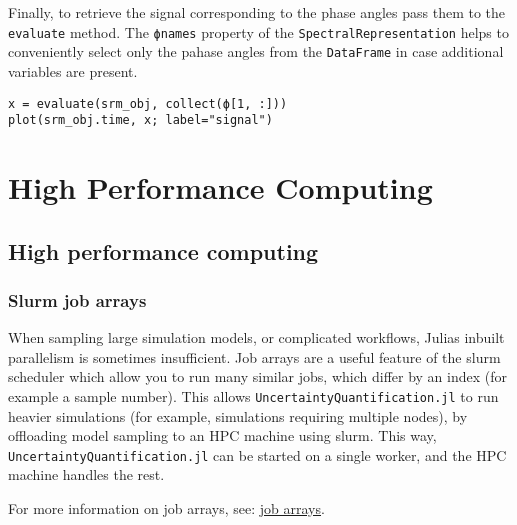 Finally, to retrieve the signal corresponding to the phase angles  pass them to the \texttt{evaluate} method. The \texttt{ϕnames} property of the \texttt{SpectralRepresentation} helps to conveniently select only the pahase angles from the \texttt{DataFrame} in case additional variables are present.




\begin{verbatim}
x = evaluate(srm_obj, collect(ϕ[1, :]))
plot(srm_obj.time, x; label="signal")
\end{verbatim}



\begin{figure}
\centering
\caption{}
\end{figure}




\chapter{High Performance Computing}


\section{High performance computing}



\label{15324308029856110982}{}


\subsection{Slurm job arrays}



\label{3608381597528543034}{}


When sampling large simulation models, or complicated workflows, Julia{\textquotesingle}s inbuilt parallelism is sometimes insufficient. Job arrays are a useful feature of the slurm scheduler which allow you to run many similar jobs, which differ by an index (for example a sample number). This allows \texttt{UncertaintyQuantification.jl} to run heavier simulations (for example, simulations requiring multiple nodes), by offloading model sampling to an HPC machine using slurm. This way, \texttt{UncertaintyQuantification.jl} can be started on a single worker, and the HPC machine handles the rest.



For more information on job arrays, see: \href{https://slurm.schedmd.com/job\_array.html}{job arrays}.



